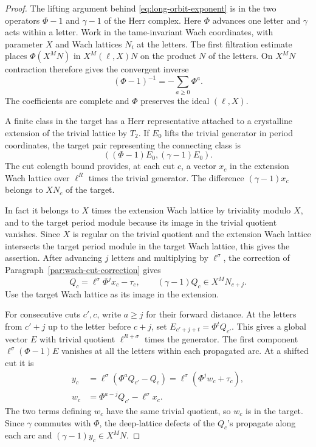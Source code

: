 \begin{proof}
The lifting argument behind \eqref{eq:long-orbit-exponent} is
in the two operators \(\Phi-1\) and \(\gamma-1\) of the Herr
complex. Here \(\Phi\) advances one letter and \(\gamma\) acts
within a letter. Work in the tame-invariant Wach coordinates,
with parameter \(X\) and Wach lattices \(N_i\) at the letters.
The first filtration estimate places \(\Phi(X^M N)\) in
\(X^M(\ell,X)N\) on the product \(N\) of the letters. On \(X^MN\) contraction therefore gives the convergent inverse
\[
 (\Phi-1)^{-1}=-\sum_{a\ge0}\Phi^a.
\]
The coefficients are complete and
\(\Phi\) preserves the ideal \((\ell,X)\).

A finite class in the target has a Herr representative attached to
a crystalline extension of the trivial lattice by \(T_2\). If \(E_0\) lifts the trivial generator in period coordinates, the target pair representing the connecting class is
\[
 ((\Phi-1)E_0,(\gamma-1)E_0).
\]
The
cut colength bound provides, at each cut \(c\), a vector \(x_c\)
in the extension Wach lattice over \(\ell^R\) times the trivial
generator. The difference \((\gamma-1)x_c\) belongs to \(XN_c\)
of the target.

In fact it belongs to \(X\) times the extension
Wach lattice by triviality modulo \(X\), and to the target
period module because its image in the trivial quotient vanishes.
Since \(X\) is regular on the trivial quotient and the
extension Wach lattice intersects the target period module in the
target Wach lattice, this gives the assertion. After advancing
\(j\) letters and multiplying by \(\ell^\sigma\), the correction
of Paragraph~\ref{par:wach-cut-correction} gives
\[
       Q_c=\ell^\sigma\Phi^j x_c-\tau_c,
       \qquad (\gamma-1)Q_c\in X^M N_{c+j}.
\]
Use the target Wach lattice as its image in the extension.

For consecutive cuts \(c',c\), write \(a\ge j\) for their
forward distance. At the letters from \(c'+j\) up to the
letter before \(c+j\), set \(E_{c'+j+t}=\Phi^tQ_{c'}\).
This gives a global vector \(E\) with trivial quotient
\(\ell^{R+\sigma}\) times the generator. The first component
\(\ell^\sigma(\Phi-1)E\) vanishes at all the letters within
each propagated arc. At a shifted cut it is
\[
 \begin{split}
   y_c&=\ell^\sigma(\Phi^a Q_{c'}-Q_c)
       =\ell^\sigma(\Phi^j w_c+\tau_c),\\
   w_c&=\Phi^{a-j}Q_{c'}-\ell^\sigma x_c.
 \end{split}
\]
The two terms defining \(w_c\) have the same trivial
quotient, so \(w_c\) is in the target. Since \(\gamma\)
commutes with \(\Phi\), the deep-lattice defects of the
\(Q_c\)'s propagate along each arc and
\((\gamma-1)y_c\in X^M N\).


\end{proof}
